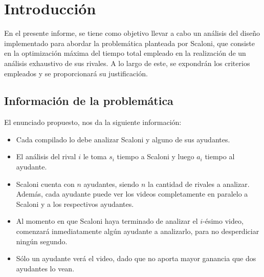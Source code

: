 \section{Introducción}

En el presente informe, se tiene como objetivo llevar a cabo un análisis del diseño 
implementado para abordar la problemática planteada por Scaloni, que consiste en la 
optimización máxima del tiempo total empleado en la realización de un análisis exhaustivo 
de sus rivales. A lo largo de este, se expondrán los criterios empleados y se proporcionará 
su justificación.


\subsection{Información de la problemática}

El enunciado propuesto, nos da la siguiente información:

\begin{itemize}

    \item Cada compilado lo debe analizar Scaloni y alguno de sus ayudantes.

    \item El análisis del rival $i$ le toma $s_i$ tiempo a Scaloni y luego $a_i$ tiempo al ayudante.

    \item Scaloni cuenta con $n$ ayudantes, siendo $n$ la cantidad de rivales a analizar. Además, cada
        ayudante puede ver los videos completamente en paralelo a Scaloni y a los respectivos ayudantes.

    \item Al momento en que Scaloni haya terminado de analizar el $i$-ésimo video, comenzará
        inmediatamente algún ayudante a analizarlo, para no desperdiciar ningún segundo.

    \item Sólo un ayudante verá el video, dado que no aporta mayor ganancia que dos ayudantes lo vean.

\end{itemize}
